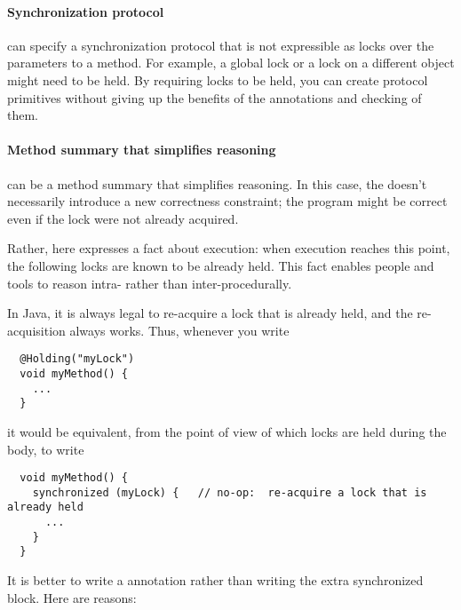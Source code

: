 \paragraph{Synchronization protocol\label{lock-checker-holding-synchronization-protocol}}

   can specify a synchronization protocol that
  is not expressible as locks over the parameters to a method.  For example, a global lock
  or a lock on a different object might need to be held.  By requiring locks to be
  held, you can create protocol primitives without giving up
  the benefits of the annotations and checking of them.

\paragraph{Method summary that simplifies reasoning\label{lock-checker-holding-method-summary}}

   can be a method summary that simplifies reasoning.  In
  this case, the  doesn't necessarily introduce a new
  correctness constraint; the program might be correct even if the lock
  were not already acquired.

  Rather, here  expresses a fact about execution:  when
  execution reaches this point, the following locks are known to be already held.  This
  fact enables people and tools to reason intra- rather than
  inter-procedurally.

  In Java, it is always legal to re-acquire a lock that is already held,
  and the re-acquisition always works.  Thus, whenever you write

\begin{Verbatim}
  @Holding("myLock")
  void myMethod() {
    ...
  }
\end{Verbatim}

\noindent
it would be equivalent, from the point of view of which locks are held
during the body, to write

\begin{Verbatim}
  void myMethod() {
    synchronized (myLock) {   // no-op:  re-acquire a lock that is already held
      ...
    }
  }
\end{Verbatim}


It is better to write a  annotation rather than writing the
extra synchronized block.  Here are reasons:

